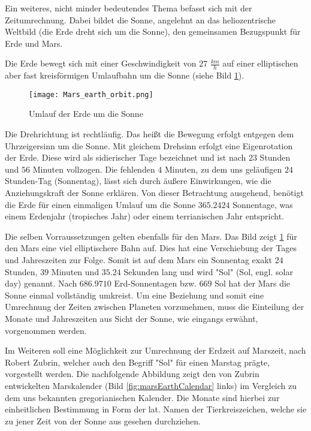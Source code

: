 Ein weiteres, nicht minder bedeutendes Thema befasst sich mit der
Zeitumrechnung. Dabei bildet die Sonne, angelehnt an das heliozentrische
Weltbild (die Erde dreht sich um die Sonne), den gemeinsamen Bezugspunkt für
Erde und Mars.

Die Erde bewegt sich mit einer Geschwindigkeit von $27$ $\frac{km}{h}$ auf einer
elliptischen aber fast kreisförmigen Umlaufbahn um die Sonne (siehe Bild
\ref{fig:marsEarthOrbit}).

\begin{figure}[H]
	\centering
	\texttt{[image: Mars\_earth\_orbit.png]}
	\label{fig:marsEarthOrbit}
	\caption{Umlauf der Erde um die Sonne}
\end{figure}

Die Drehrichtung ist rechtläufig. Das heißt die Bewegung erfolgt entgegen dem
Uhrzeigersinn um die Sonne. Mit gleichem Drehsinn erfolgt eine Eigenrotation
der Erde. Diese wird als sidierischer Tage bezeichnet und ist nach $23$ Stunden
und $56$ Minuten vollzogen. Die fehlenden $4$ Minuten, zu dem uns geläufigen
$24$ Stunden-Tag (Sonnentag), lässt sich durch äußere Einwirkungen, wie die
Anziehungskraft der Sonne erklären. Von dieser Betrachtung ausgehend, benötigt
die Erde für einen einmaligen Umlauf um die Sonne $365.2424$ Sonnentage, was
einem Erdenjahr (tropisches Jahr) oder einem terrianischen Jahr entspricht. 

Die selben Vorraussetzungen gelten ebenfalls für den Mars. Das Bild zeigt
\ref{fig:marsEarthOrbit} für den Mars eine viel elliptischere Bahn auf. Dies hat
eine Verschiebung der Tages und Jahreszeiten zur Folge. Somit ist auf dem Mars
ein Sonnentag exakt $24$ Stunden, $39$ Minuten und $35.24$ Sekunden lang und
wird "Sol" (Sol, engl. solar day) genannt. Nach $686.9710$ Erd-Sonnentagen bzw.
$669$ Sol hat der Mars die Sonne einmal vollständig umkreist. Um eine Beziehung
und somit eine Umrechnung der Zeiten zwischen Planeten vorzunehmen, muss die
Einteilung der Monate und Jahreszeiten aus Sicht der Sonne, wie eingangs
erwähnt, vorgenommen werden. 

Im Weiteren soll eine Möglichkeit zur Umrechnung der Erdzeit auf Marszeit, nach
Robert Zubrin,  welcher auch den Begriff "Sol" für einen Marstag prägte,
vorgestellt werden. Die nachfolgende Abbildung zeigt den von Zubrin entwickelten
Marskalender (Bild \ref{fig:marsEarthCalendar} links) im Vergleich zu dem uns
bekannten gregorianischen Kalender. Die Monate sind hierbei zur einheitlichen
Bestimmung in Form der lat. Namen der Tierkreiszeichen, welche sie zu jener Zeit
von der Sonne aus gesehen durchziehen.

